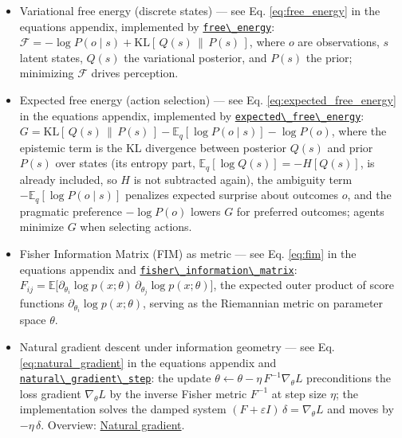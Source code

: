 \documentclass[
  10pt,
]{article}
\newcommand{\passthrough}[1]{#1}
\begin{document}
\begin{itemize}
\item
  Variational free energy (discrete states) --- see Eq.
  \eqref{eq:free_energy} in the equations appendix, implemented by
  \href{03_quadray_methods.md\#code:free_energy}{\passthrough{\lstinline!free\_energy!}}:
  \(\mathcal{F} = -\log P(o \mid s) + \mathrm{KL}[\,Q(s)\,\|\,P(s)\,]\),
  where \(o\) are observations, \(s\) latent states, \(Q(s)\) the
  variational posterior, and \(P(s)\) the prior; minimizing
  \(\mathcal{F}\) drives perception.
\item
  Expected free energy (action selection) --- see Eq.
  \eqref{eq:expected_free_energy} in the equations appendix, implemented
  by
  \href{03_quadray_methods.md\#code:expected_free_energy}{\passthrough{\lstinline!expected\_free\_energy!}}:
  \(G = \mathrm{KL}[\,Q(s)\,\|\,P(s)\,] - \mathbb{E}_{q}[\log P(o \mid s)] - \log P(o)\),
  where the epistemic term is the KL divergence between posterior
  \(Q(s)\) and prior \(P(s)\) over states (its entropy part,
  \(\mathbb{E}_{q}[\log Q(s)] = -H[Q(s)]\), is already included, so
  \(H\) is not subtracted again), the ambiguity term
  \(-\mathbb{E}_{q}[\log P(o \mid s)]\) penalizes expected surprise
  about outcomes \(o\), and the pragmatic preference \(-\log P(o)\)
  lowers \(G\) for preferred outcomes; agents minimize \(G\) when
  selecting actions.
\item
  Fisher Information Matrix (FIM) as metric --- see Eq. \eqref{eq:fim}
  in the equations appendix and
  \href{03_quadray_methods.md\#code:fisher_information_matrix}{\passthrough{\lstinline!fisher\_information\_matrix!}}:
  \(F_{ij} = \mathbb{E}\big[\partial_{\theta_i} \log p(x;\theta)\, \partial_{\theta_j} \log p(x;\theta)\big]\),
  the expected outer product of score functions
  \(\partial_{\theta_i} \log p(x;\theta)\), serving as the Riemannian
  metric on parameter space \(\theta\).
\item
  Natural gradient descent under information geometry --- see Eq.
  \eqref{eq:natural_gradient} in the equations appendix and
  \href{03_quadray_methods.md\#code:natural_gradient_step}{\passthrough{\lstinline!natural\_gradient\_step!}}:
  the update
  \(\theta \leftarrow \theta - \eta\, F^{-1} \nabla_{\theta} L\)
  preconditions the loss gradient \(\nabla_{\theta} L\) by the inverse
  Fisher metric \(F^{-1}\) at step size \(\eta\); the implementation
  solves the damped system
  \((F + \varepsilon I)\,\delta = \nabla_{\theta} L\) and moves by
  \(-\eta\,\delta\). Overview:
  \href{https://en.wikipedia.org/wiki/Natural_gradient}{Natural
  gradient}.
\end{itemize}
\end{document}
